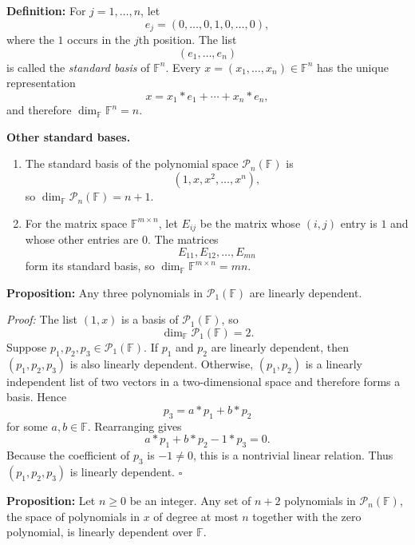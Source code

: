 \documentclass[a4paper,11pt,abstract=true]{scrartcl}
\theoremstyle{dotlessP}
\theoremstyle{dotlessS}
\theoremstyle{remark}
\theoremstyle{definition}
\begin{document}
\begin{definition_box}
\textbf{Definition:} For $j=1,\ldots,n$, let
\[
e_j=(0,\ldots,0,1,0,\ldots,0),
\]
where the $1$ occurs in the $j$th position. The list
\[
(e_1,\ldots,e_n)
\]
is called the \emph{standard basis} of $\mathbb{F}^n$. Every
$x=(x_1,\ldots,x_n)\in \mathbb{F}^n$ has the unique representation
\[
x=x_1*e_1+\cdots+x_n*e_n,
\]
and therefore $\dim_{\mathbb{F}} \mathbb{F}^n=n$.
\end{definition_box}

\begin{example_box}
\textbf{Other standard bases.}
\begin{enumerate}
    \item The standard basis of the polynomial space
    $\mathcal{P}_n(\mathbb{F})$ is
    \[
    (1,x,x^2,\ldots,x^n),
    \]
    so $\dim_{\mathbb{F}}\mathcal{P}_n(\mathbb{F})=n+1$.

    \item For the matrix space $\mathbb{F}^{m\times n}$, let $E_{ij}$ be the matrix
    whose $(i,j)$ entry is $1$ and whose other entries are $0$. The matrices
    \[
    E_{11},E_{12},\ldots,E_{mn}
    \]
    form its standard basis, so $\dim_{\mathbb{F}} \mathbb{F}^{m\times n}=mn$.
\end{enumerate}
\end{example_box}

\begin{problem_box}
\textbf{Proposition:} Any three polynomials in $\mathcal{P}_1(\mathbb{F})$ are
linearly dependent.

\end{problem_box}

\begin{claim_box}
\textit{Proof:} The list $(1,x)$ is a basis of $\mathcal{P}_1(\mathbb{F})$, so
\[
\dim_{\mathbb{F}}\mathcal{P}_1(\mathbb{F})=2.
\]
Suppose $p_1,p_2,p_3\in\mathcal{P}_1(\mathbb{F})$. If $p_1$ and $p_2$ are linearly
dependent, then $(p_1,p_2,p_3)$ is also linearly dependent. Otherwise,
$(p_1,p_2)$ is a linearly independent list of two vectors in a
two-dimensional space and therefore forms a basis. Hence
\[
p_3=a*p_1+b*p_2
\]
for some $a,b\in \mathbb{F}$. Rearranging gives
\[
a*p_1+b*p_2-1*p_3=0.
\]
Because the coefficient of $p_3$ is $-1\neq0$, this is a nontrivial linear
relation. Thus $(p_1,p_2,p_3)$ is linearly dependent. \hfill$\square$
\end{claim_box}

\begin{problem_box}
\textbf{Proposition:} Let $n\geq0$ be an
integer. Any set of $n+2$ polynomials in $\mathcal{P}_n(\mathbb{F})$, the
space of polynomials in $x$ of degree at most $n$ together with the zero
polynomial, is linearly dependent over $\mathbb{F}$.

\end{problem_box}
\end{document}
